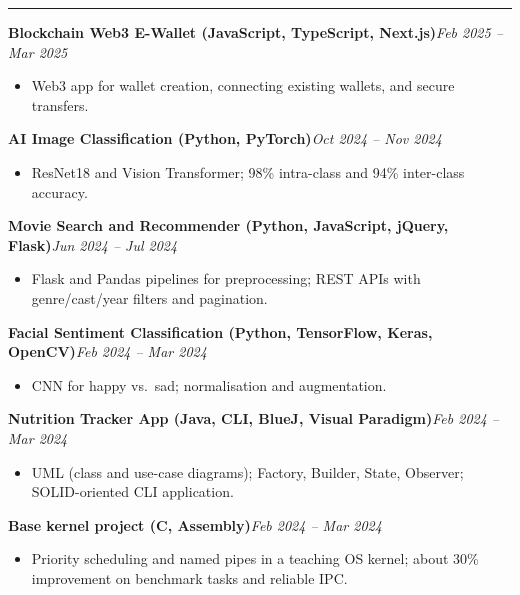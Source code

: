 \documentclass[10pt,a4paper]{article}
\newcommand{\ressection}[1]{%
  \vspace{0.8em}%
  \noindent{\large\scshape\bfseries #1}\par\nobreak
  \vspace{-\parskip}%
  \vspace{-\parskip}%
  \vspace{-\parskip}%
  \vspace{-\parskip}%
  \noindent\rule{\linewidth}{0.1pt}\par\nobreak
  \vspace{-\parskip}%
}
\newcommand{\resumeHeading}[2]{%
  \vspace{0.6em}%
  \noindent\textbf{\small #1}\hfill\textit{\small #2}\par\vspace{0.28em}}
\begin{document}
\ressection{Projects}

\resumeHeading{Blockchain Web3 E-Wallet (JavaScript, TypeScript, Next.js)}{Feb 2025 -- Mar 2025}
\begin{itemize}
  \item Web3 app for wallet creation, connecting existing wallets, and secure transfers.
\end{itemize}

\resumeHeading{AI Image Classification (Python, PyTorch)}{Oct 2024 -- Nov 2024}
\begin{itemize}
  \item ResNet18 and Vision Transformer; 98\% intra-class and 94\% inter-class accuracy.
\end{itemize}

\resumeHeading{Movie Search and Recommender (Python, JavaScript, jQuery, Flask)}{Jun 2024 -- Jul 2024}
\begin{itemize}
  \item Flask and Pandas pipelines for preprocessing; REST APIs with genre/cast/year filters and pagination.
\end{itemize}

\resumeHeading{Facial Sentiment Classification (Python, TensorFlow, Keras, OpenCV)}{Feb 2024 -- Mar 2024}
\begin{itemize}
  \item CNN for happy vs.\ sad; normalisation and augmentation.
\end{itemize}

\resumeHeading{Nutrition Tracker App (Java, CLI, BlueJ, Visual Paradigm)}{Feb 2024 -- Mar 2024}
\begin{itemize}
  \item UML (class and use-case diagrams); Factory, Builder, State, Observer; SOLID-oriented CLI application.
\end{itemize}

\resumeHeading{Base kernel project (C, Assembly)}{Feb 2024 -- Mar 2024}
\begin{itemize}
  \item Priority scheduling and named pipes in a teaching OS kernel; about 30\% improvement on benchmark tasks and reliable IPC.
\end{itemize}
\end{document}
